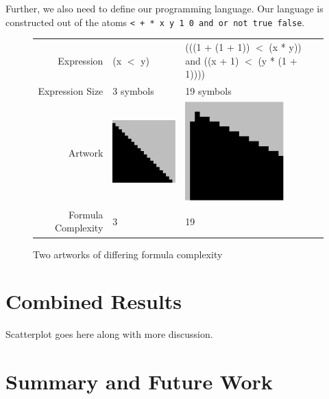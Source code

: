 \documentclass[11pt]{article}
\begin{document}
Further, we also need to define our programming language.  Our language is
constructed out of the atoms {\tt < + * x y 1 0 and or not true false}.


\begin{figure}
\begin{center}
\begin{tabular}{r | p{2in}   p{2in}}
Expression & (x $<$ y) &
(((1 + (1 + 1)) $<$  (x * y)) and 
          ((x + 1) $<$ (y * (1 + 1)))) \\
Expression Size & 3 symbols & 19 symbols\\
  Artwork & \includegraphics[width=1.5in]{../presentation/simple.png} &
  \includegraphics[width=1.5in]{../presentation/complex.png} \\
Formula Complexity& 3 &
19
\end{tabular}
\end{center}

\caption{Two artworks of differing formula complexity}
\end{figure}




\section{Combined Results}

Scatterplot goes here along with more discussion.

\section{Summary and Future Work}
\end{document}
